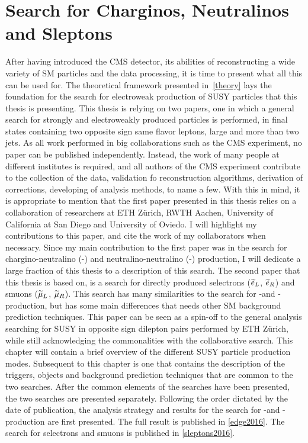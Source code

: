 \chapter{Search for Charginos, Neutralinos and Sleptons} \label{strategySlepton}
After having introduced the CMS detector, its abilities of reconstructing a wide variety of SM particles and the data processing, it is time to present what all this can be used for. 
The theoretical framework presented in~\ref{theory} lays the foundation for the search for electroweak production of SUSY particles that this thesis is presenting. 
This thesis is relying on two papers, one in which a general search for strongly and electroweakly produced particles is performed, in final states containing two opposite sign same flavor leptons, large \ptmiss and more than two jets. 
As all work performed in big collaborations such as the CMS experiment, no paper can be published independently. 
Instead, the work of many people at different institutes is required, and all authors of the CMS experiment contribute to the collection of the data, validation fo reconstruction algorithms, derivation of corrections, developing of analysis methods, to name a few. 
With this in mind, it is appropriate to mention that the first paper presented in this thesis relies on a collaboration of researchers at ETH Z\"{u}rich, RWTH Aachen, University of California at San Diego and University of Oviedo. 
I will highlight my contributions to this paper, and cite the work of my collaborators when necessary. 
Since my main contribution to the first paper was in the search for chargino-neutralino (\firstcharg-\secondchi) and neutralino-neutralino (\firstchi-\firstchi) production, I will dedicate a large fraction of this thesis to a description of this search. 
The second paper that this thesis is based on, is a search for directly produced selectrons ($\widetilde{e}_{L}$, $\widetilde{e}_{R}$) and smuons ($\widetilde{\mu}_{L}$, $\widetilde{\mu}_{R}$). 
This search has many similarities to the search for \firstcharg-\secondchi and \firstchi-\firstchi production, but has some main differences that needs other SM background prediction techniques. 
This paper can be seen as a spin-off to the general analysis searching for SUSY in opposite sign dilepton pairs performed by ETH Z\"{u}rich, while still acknowledging the commonalities with the collaborative search. 
This chapter will contain a brief overview of the different SUSY particle production modes. 
Subsequent to this chapter is one that contains the description of the triggers, objects and background prediction techniques that are common to the two searches. 
After the common elements of the searches have been presented, the two searches are presented separately. 
Following the order dictated by the date of publication, the analysis strategy and results for the search for \firstcharg-\secondchi and \firstchi-\firstchi production are first presented. 
The full result is published in \ref{edge2016}. 
The search for selectrons and smuons is published in \ref{sleptons2016}.
